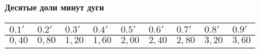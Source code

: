 \begin{center}
  \textbf{Десятые доли минут дуги}

  {\scriptsize
    \begin{tabularx}{\linewidth}{X|X|X|X|X|X|X|X|X}
      \toprule
      $0.1'$ & $0.2'$ & $0.3'$ & $0.4'$ & $0.5'$ & $0.6'$ & $0.7'$ & $0.8'$ & $0.9'$ \\
      \midrule
      $ 0,40 $ & $ 0,80 $ & $ 1,20 $ & $ 1,60 $ & $ 2,00 $ & $ 2,40 $ & $ 2,80 $ & $ 3,20 $ & $ 3,60 $ \\
      \bottomrule
    \end{tabularx}
  }
  
\end{center}


